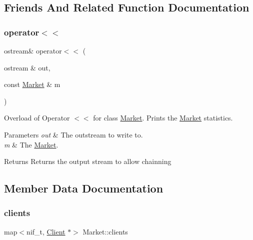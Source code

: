 \subsection{Friends And Related Function Documentation}
\mbox{\label{class_market_a7011d607c3f984135fbc081b8909a1d6}} 
\subsubsection{\texorpdfstring{operator$<$$<$}{operator<<}}
{\footnotesize\ttfamily ostream\& operator$<$$<$ (\begin{DoxyParamCaption}\item[{ostream \&}]{out,  }\item[{const \hyperlink{class_market}{Market} \&}]{m }\end{DoxyParamCaption})\hspace{0.3cm}{\ttfamily [friend]}}

Overload of Operator $<$$<$ for class \hyperlink{class_market}{Market}. Prints the \hyperlink{class_market}{Market} statistics. 
\begin{DoxyParams}{Parameters}
{\em out} & The outstream to write to. \\
\hline
{\em m} & The \hyperlink{class_market}{Market}. \\
\hline
\end{DoxyParams}
\begin{DoxyReturn}{Returns}
Returns the output stream to allow chainning 
\end{DoxyReturn}


\subsection{Member Data Documentation}
\mbox{\label{class_market_a78e8cb9fd9f208c1ea819916e4594095}} 
\subsubsection{\texorpdfstring{clients}{clients}}
{\footnotesize\ttfamily map$<$nif\+\_\+t, \hyperlink{class_client}{Client} $\ast$$>$ Market\+::clients\hspace{0.3cm}{\ttfamily [private]}}

